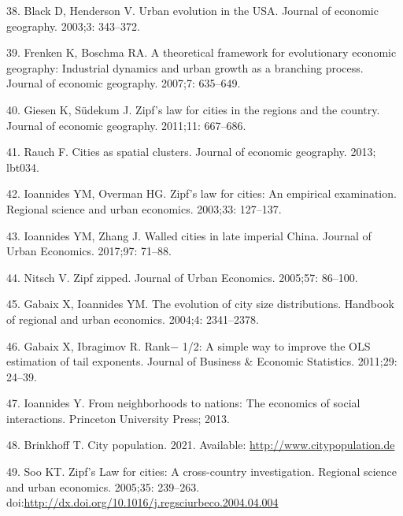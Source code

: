 \documentclass[10pt,letterpaper]{article}
\begin{document}
\leavevmode\hypertarget{ref-black_urban_2003}{}%
38. Black D, Henderson V. Urban evolution in the USA. Journal of
economic geography. 2003;3: 343--372.

\leavevmode\hypertarget{ref-frenken_theoretical_2007}{}%
39. Frenken K, Boschma RA. A theoretical framework for evolutionary
economic geography: Industrial dynamics and urban growth as a branching
process. Journal of economic geography. 2007;7: 635--649.

\leavevmode\hypertarget{ref-giesen_zipfs_2011}{}%
40. Giesen K, Südekum J. Zipf's law for cities in the regions and the
country. Journal of economic geography. 2011;11: 667--686.

\leavevmode\hypertarget{ref-rauch_cities_2013}{}%
41. Rauch F. Cities as spatial clusters. Journal of economic geography.
2013; lbt034.

\leavevmode\hypertarget{ref-ioannides_zipfs_2003}{}%
42. Ioannides YM, Overman HG. Zipf's law for cities: An empirical
examination. Regional science and urban economics. 2003;33: 127--137.

\leavevmode\hypertarget{ref-ioannides_walled_2017}{}%
43. Ioannides YM, Zhang J. Walled cities in late imperial China. Journal
of Urban Economics. 2017;97: 71--88.

\leavevmode\hypertarget{ref-nitsch_zipf_2005}{}%
44. Nitsch V. Zipf zipped. Journal of Urban Economics. 2005;57: 86--100.

\leavevmode\hypertarget{ref-gabaix_evolution_2004}{}%
45. Gabaix X, Ioannides YM. The evolution of city size distributions.
Handbook of regional and urban economics. 2004;4: 2341--2378.

\leavevmode\hypertarget{ref-gabaix_rank_2011}{}%
46. Gabaix X, Ibragimov R. Rank− 1/2: A simple way to improve the OLS
estimation of tail exponents. Journal of Business \& Economic
Statistics. 2011;29: 24--39.

\leavevmode\hypertarget{ref-ioannides2013neighborhoods}{}%
47. Ioannides Y. From neighborhoods to nations: The economics of social
interactions. Princeton University Press; 2013.

\leavevmode\hypertarget{ref-citypop}{}%
48. Brinkhoff T. City population. 2021. Available:
\url{http://www.citypopulation.de}

\leavevmode\hypertarget{ref-soo_zipfs_2005}{}%
49. Soo KT. Zipf's Law for cities: A cross-country investigation.
Regional science and urban economics. 2005;35: 239--263.
doi:\href{https://doi.org/http://dx.doi.org/10.1016/j.regsciurbeco.2004.04.004}{http://dx.doi.org/10.1016/j.regsciurbeco.2004.04.004}
\end{document}
